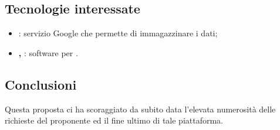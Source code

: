 \subsection{Tecnologie interessate}
\begin{itemize}
    \item \textbf{}: servizio Google che permette di immagazzinare i dati;
    \item \textbf{, }: software per .
\end{itemize}   

\subsection{Conclusioni}
Questa proposta ci ha scoraggiato da subito data l’elevata numerosità delle richieste del proponente ed il fine ultimo di tale piattaforma.
